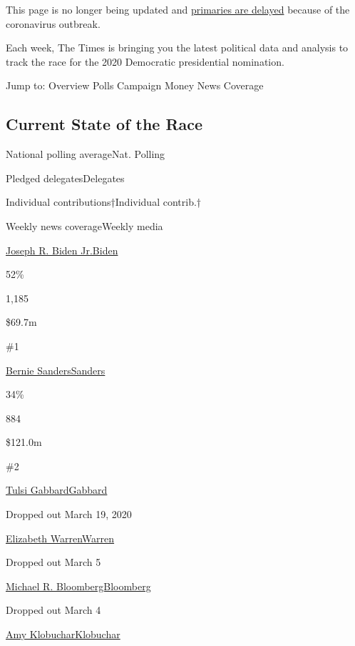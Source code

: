 This page is no longer being updated and
\href{https://www.nytimes3xbfgragh.onion/interactive/2020/us/elections/delegate-count-primary-results.html}{primaries
are delayed} because of the coronavirus outbreak.

Each week, The Times is bringing you the latest political data and
analysis to track the race for the 2020 Democratic presidential
nomination.

Jump to: Overview Polls Campaign Money News Coverage

\hypertarget{current-state-of-the-race}{%
\subsection{Current State of the Race}\label{current-state-of-the-race}}

National polling averageNat. Polling

Pledged delegatesDelegates

Individual contributions†Individual contrib.†

Weekly news coverageWeekly media

\href{https://www.nytimes3xbfgragh.onion/interactive/2020/us/elections/joe-biden.html}{Joseph
R. Biden Jr.Biden}

52\%

1,185

\$69.7m

\#1

\href{https://www.nytimes3xbfgragh.onion/interactive/2020/us/elections/bernie-sanders.html}{Bernie
SandersSanders}

34\%

884

\$121.0m

\#2

\href{https://www.nytimes3xbfgragh.onion/interactive/2020/us/elections/tulsi-gabbard.html}{Tulsi
GabbardGabbard}

Dropped out March 19, 2020

\href{https://www.nytimes3xbfgragh.onion/interactive/2020/us/elections/elizabeth-warren.html}{Elizabeth
WarrenWarren}

Dropped out March 5

\href{https://www.nytimes3xbfgragh.onion/interactive/2020/us/elections/michael-bloomberg.html}{Michael
R. BloombergBloomberg}

Dropped out March 4

\href{https://www.nytimes3xbfgragh.onion/interactive/2020/us/elections/amy-klobuchar.html}{Amy
KlobucharKlobuchar}

